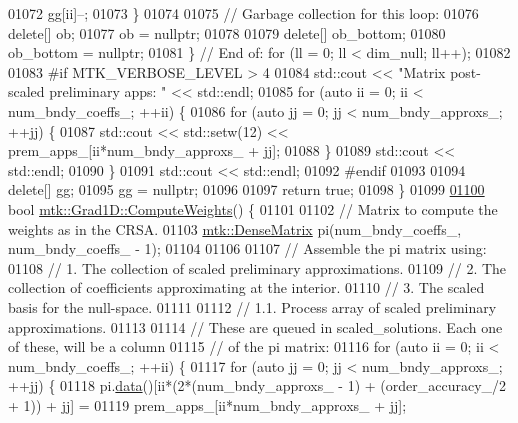 \begin{DoxyCode}
{{01072       gg[ii]--;
01073     \}
01074 
01075     \textcolor{comment}{// Garbage collection for this loop:}
01076     \textcolor{keyword}{delete}[] ob;
01077     ob = \textcolor{keyword}{nullptr};
01078 
01079     \textcolor{keyword}{delete}[] ob\_bottom;
01080     ob\_bottom = \textcolor{keyword}{nullptr};
01081   \} \textcolor{comment}{// End of: for (ll = 0; ll < dim\_null; ll++);}
01082 
01083 \textcolor{preprocessor}{  #if MTK\_VERBOSE\_LEVEL > 4}
01084   std::cout << \textcolor{stringliteral}{"Matrix post-scaled preliminary apps: "} << std::endl;
01085   \textcolor{keywordflow}{for} (\textcolor{keyword}{auto} ii = 0; ii < num\_bndy\_coeffs\_; ++ii) \{
01086     \textcolor{keywordflow}{for} (\textcolor{keyword}{auto} jj = 0; jj < num\_bndy\_approxs\_; ++jj) \{
01087       std::cout << std::setw(12) << prem\_apps\_[ii*num\_bndy\_approxs\_ + jj];
01088     \}
01089     std::cout << std::endl;
01090   \}
01091   std::cout << std::endl;
01092 \textcolor{preprocessor}{  #endif}
01093 
01094   \textcolor{keyword}{delete}[] gg;
01095   gg = \textcolor{keyword}{nullptr};
01096 
01097   \textcolor{keywordflow}{return} \textcolor{keyword}{true};
01098 \}
01099 
\hypertarget{mtk__grad__1d_8cc_source_l01100}{}\hyperlink{classmtk_1_1Grad1D_a224082617751864bffca9bfe494c36d5}{01100} \textcolor{keywordtype}{bool} \hyperlink{classmtk_1_1Grad1D_a224082617751864bffca9bfe494c36d5}{mtk::Grad1D::ComputeWeights}() \{
01101 
01102   \textcolor{comment}{// Matrix to compute the weights as in the CRSA.}
01103   \hyperlink{classmtk_1_1DenseMatrix}{mtk::DenseMatrix} pi(num\_bndy\_coeffs\_, num\_bndy\_coeffs\_ - 1);
01104 
01106 
01107   \textcolor{comment}{// Assemble the pi matrix using:}
01108   \textcolor{comment}{// 1. The collection of scaled preliminary approximations.}
01109   \textcolor{comment}{// 2. The collection of coefficients approximating at the interior.}
01110   \textcolor{comment}{// 3. The scaled basis for the null-space.}
01111 
01112   \textcolor{comment}{// 1.1. Process array of scaled preliminary approximations.}
01113 
01114   \textcolor{comment}{// These are queued in scaled\_solutions. Each one of these, will be a column}
01115   \textcolor{comment}{// of the pi matrix:}
01116   \textcolor{keywordflow}{for} (\textcolor{keyword}{auto} ii = 0; ii < num\_bndy\_coeffs\_; ++ii) \{
01117     \textcolor{keywordflow}{for} (\textcolor{keyword}{auto} jj = 0; jj < num\_bndy\_approxs\_; ++jj) \{
01118       pi.\hyperlink{classmtk_1_1DenseMatrix_a0c33b8a9e01d157c61ddbdf807c25d84}{data}()[ii*(2*(num\_bndy\_approxs\_ - 1) + (order\_accuracy\_/2 + 1)) + jj] =
01119         prem\_apps\_[ii*num\_bndy\_approxs\_ + jj];
}}
\end{DoxyCode}
